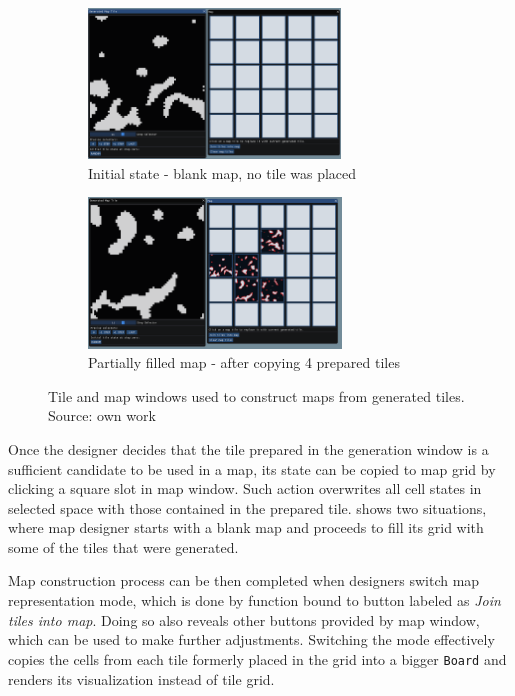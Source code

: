 \documentclass[12pt]{report}
\begin{document}
\begin{figure}[H]
	\centering
	\begin{subfigure}[t]{0.9\textwidth}
		\centering
		\includegraphics[height=4cm]{images/mapnotiles}
		\caption{Initial state - blank map, no tile was placed} 
	\end{subfigure}  
	\begin{subfigure}[t]{0.9\textwidth}
		\centering
		\includegraphics[height=4cm]{images/map4tiles}
		\caption{Partially filled map - after copying 4 prepared tiles} 
	\end{subfigure} 
	\caption{Tile and map windows used to construct maps from generated tiles. Source: own work}
	\label{fig:map_merging}
\end{figure}

Once the designer decides that the tile prepared in the generation window is a sufficient candidate to be used in a map, its state can be copied to map grid by clicking a square slot in map window. Such action overwrites all cell states in selected space with those contained in the prepared tile.  shows two situations, where map designer starts with a blank map and proceeds to fill its grid with some of the tiles that were generated.

Map construction process can be then completed when designers switch map representation mode, which is done by function bound to button labeled as \textit{Join tiles into map}. Doing so also reveals other buttons provided by map window, which can be used to make further adjustments. Switching the mode effectively copies the cells from each tile formerly placed in the grid into a bigger \texttt{Board} and renders its visualization instead of tile grid.
\end{document}
